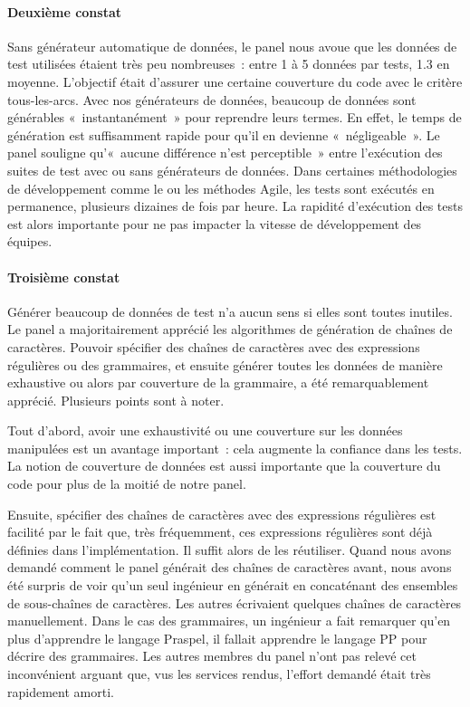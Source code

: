 \paragraph{Deuxième constat} Sans générateur automatique de données, le panel
nous avoue que les données de test utilisées étaient très peu nombreuses~:
entre 1 à 5 données par tests, 1.3 en moyenne. L'objectif était d'assurer une
certaine couverture du code avec le critère tous-les-arcs. Avec nos générateurs
de données, beaucoup de données sont générables «~instantanément~» pour
reprendre leurs termes. En effet, le temps de génération est suffisamment rapide
pour qu'il en devienne «~négligeable~». Le panel souligne qu'«~aucune différence
n'est perceptible~» entre l'exécution des suites de test avec ou sans
générateurs de données. Dans certaines méthodologies de développement comme le
 ou les méthodes Agile, les tests sont
exécutés en permanence, plusieurs dizaines de fois par heure. La rapidité
d'exécution des tests est alors importante pour ne pas impacter la vitesse de
développement des équipes.

\paragraph{Troisième constat} Générer beaucoup de données de test n'a aucun
sens si elles sont toutes inutiles. Le panel a majoritairement apprécié les
algorithmes de génération de chaînes de caractères. Pouvoir spécifier des
chaînes de caractères avec des expressions régulières ou des grammaires, et
ensuite générer toutes les données de manière exhaustive ou alors par couverture
de la grammaire, a été remarquablement apprécié. Plusieurs points sont à noter.

Tout d'abord, avoir une exhaustivité ou une couverture sur les données
manipulées est un avantage important~: cela augmente la confiance dans les
tests. La notion de couverture de données est aussi importante que la couverture
du code pour plus de la moitié de notre panel.

Ensuite, spécifier des chaînes de caractères avec des expressions régulières est
facilité par le fait que, très fréquemment, ces expressions régulières sont déjà
définies dans l'implémentation. Il suffit alors de les réutiliser. Quand nous
avons demandé comment le panel générait des chaînes de caractères avant, nous
avons été surpris de voir qu'un seul ingénieur en générait en concaténant des
ensembles de sous-chaînes de caractères. Les autres écrivaient quelques chaînes
de caractères manuellement. Dans le cas des grammaires, un ingénieur a fait
remarquer qu'en plus d'apprendre le langage Praspel, il fallait apprendre le
langage PP pour décrire des grammaires. Les autres membres du panel n'ont pas
relevé cet inconvénient arguant que, vus les services rendus, l'effort demandé
était très rapidement amorti.

